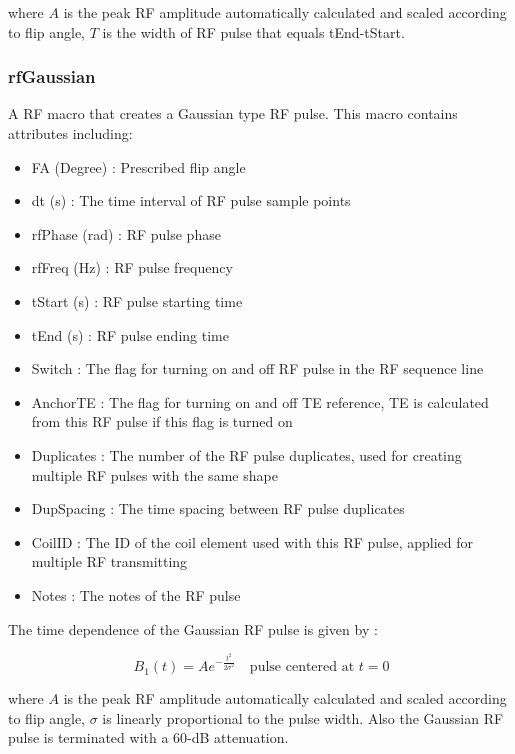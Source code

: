 \documentclass{book}%
\begin{document}
where $A$ is the peak RF amplitude automatically calculated and scaled according to flip angle, $T$ is the width of RF pulse that equals tEnd-tStart.

\subsubsection{rfGaussian}

A RF macro that creates a Gaussian type RF pulse. This macro contains attributes including:

\begin{itemize}
	\item FA (Degree) : Prescribed flip angle 
	\item dt (s) : The time interval of RF pulse sample points
	\item rfPhase (rad) : RF pulse phase
	\item rfFreq (Hz) : RF pulse frequency
	\item tStart (s) : RF pulse starting time
	\item tEnd (s) : RF pulse ending time
	\item Switch : The flag for turning on and off RF pulse in the RF sequence line
	\item AnchorTE : The flag for turning on and off TE reference, TE is calculated from this RF pulse if this flag is turned on
	\item Duplicates : The number of the RF pulse duplicates, used for creating multiple RF pulses with the same shape
	\item DupSpacing : The time spacing between RF pulse duplicates
	\item CoilID : The ID of the coil element used with this RF pulse, applied for multiple RF transmitting
	\item Notes : The notes of the RF pulse 
\end{itemize}

The time dependence of the Gaussian RF pulse is given by \cite{Handbook2004}:

\begin{equation}\
B_1(t) = A e^{-\frac{t^2}{2 \sigma ^2}} \quad \text{pulse centered at } t = 0
\label{eq:Gaussian}
\end{equation}

where $A$ is the peak RF amplitude automatically calculated and scaled according to flip angle, $\sigma$ is linearly proportional to the pulse width. Also the Gaussian RF pulse is terminated with a 60-dB attenuation.
\end{document}
